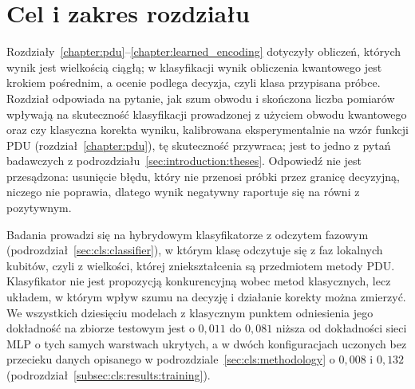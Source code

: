 \section{Cel i zakres rozdziału}\label{sec:cls:scope}

Rozdziały~\ref{chapter:pdu}--\ref{chapter:learned_encoding} dotyczyły obliczeń, których wynik jest wielkością ciągłą; w klasyfikacji wynik obliczenia kwantowego jest krokiem pośrednim, a ocenie podlega decyzja, czyli klasa przypisana próbce.
Rozdział odpowiada na pytanie, jak szum obwodu i skończona liczba pomiarów wpływają na skuteczność klasyfikacji prowadzonej z użyciem obwodu kwantowego oraz czy klasyczna korekta wyniku, kalibrowana eksperymentalnie na wzór funkcji PDU (rozdział~\ref{chapter:pdu}), tę skuteczność przywraca; jest to jedno z pytań badawczych z podrozdziału~\ref{sec:introduction:theses}.
Odpowiedź nie jest przesądzona: usunięcie błędu, który nie przenosi próbki przez granicę decyzyjną, niczego nie poprawia, dlatego wynik negatywny raportuje się na równi z pozytywnym.

Badania prowadzi się na hybrydowym klasyfikatorze z odczytem fazowym (podrozdział~\ref{sec:cls:classifier}), w którym klasę odczytuje się z faz lokalnych kubitów, czyli z wielkości, której zniekształcenia są przedmiotem metody PDU.
Klasyfikator nie jest propozycją konkurencyjną wobec metod klasycznych, lecz układem, w którym wpływ szumu na decyzję i działanie korekty można zmierzyć.
We wszystkich dziesięciu modelach z klasycznym punktem odniesienia jego dokładność na zbiorze testowym jest o $0{,}011$ do $0{,}081$ niższa od dokładności sieci MLP o tych samych warstwach ukrytych, a w dwóch konfiguracjach uczonych bez przecieku danych opisanego w podrozdziale~\ref{sec:cls:methodology} o $0{,}008$ i $0{,}132$ (podrozdział~\ref{subsec:cls:results:training}).

